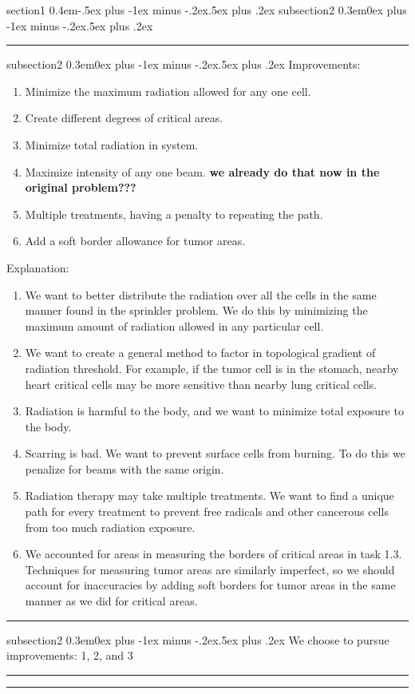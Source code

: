 \documentclass[12pt]{article}
\makeatletter
\newenvironment{task}{\@startsection
       {section}{1}
       {0.4em}{-.5ex plus -1ex minus -.2ex}{.5ex plus .2ex}
       {\pagebreak[3]\large\bf\noindent{Task}}}
       {\nopagebreak[3]\vspace{3ex}\begin{center}\rule{1\linewidth}{.3pt}\end{center}}
\newenvironment{subtask}{\@startsection
       {subsection}{2}
       {0.3em}{0ex plus -1ex minus -.2ex}{.5ex plus .2ex}
       {\pagebreak[3]\large}}
       {\nopagebreak[3]\vspace{3ex}\begin{center}\rule{0.5\linewidth}{.3pt}\end{center}}
\makeatother
\begin{document}
\begin{task}{}
\begin{subtask}{}
\end{subtask}

\begin{subtask}{}
Improvements:
\begin{enumerate}
\item Minimize the maximum radiation allowed for any one cell. 
\item Create different degrees of critical areas. 
\item Minimize total radiation in system.
\item Maximize intensity of any one beam. \textbf{ we already do that now in the original problem???}
\item Multiple treatments, having a penalty to repeating the path.
\item Add a soft border allowance for tumor areas.
\end{enumerate}

\bigskip

Explanation:
\begin{enumerate}
\item We want to better distribute the radiation over all the cells in the same manner found in the sprinkler problem. We do this by minimizing the maximum amount of radiation allowed in any particular cell. 
\item We want to create a general method to factor in topological gradient of radiation threshold. For example, if the tumor cell is in the stomach, nearby heart critical cells may be more sensitive than nearby lung critical cells.
\item Radiation is harmful to the body, and we want to minimize total exposure to the body.
\item Scarring is bad. We want to prevent surface cells from burning. To do this we penalize for beams with the same origin.
\item Radiation therapy may take multiple treatments. We want to find a unique path for every treatment to prevent free radicals and other cancerous cells from too much radiation exposure.
\item We accounted for areas in measuring the borders of critical areas in task 1.3. Techniques for measuring tumor areas are similarly imperfect, so we should account for inaccuracies by adding soft borders for tumor areas in the same manner as we did for critical areas.
\end{enumerate}
\end{subtask}


\begin{subtask}{}
We choose to pursue improvements: 1, 2, and 3
\\


\end{subtask}
\end{task}
\end{document}
